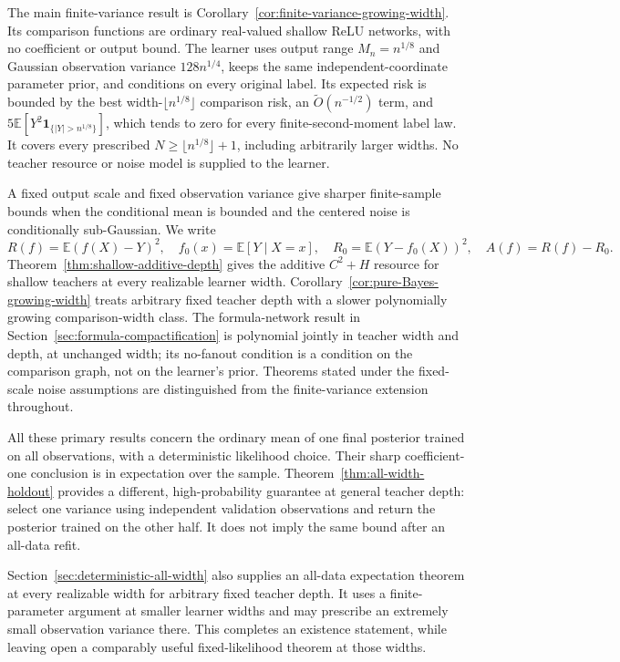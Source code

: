 \documentclass[11pt]{article}
\newcommand{\E}{\mathbb E}
\begin{document}
The main finite-variance result is Corollary~\ref{cor:finite-variance-growing-width}. Its comparison functions are ordinary real-valued shallow ReLU networks, with no coefficient or output bound. The learner uses output range $M_n=n^{1/8}$ and Gaussian observation variance $128n^{1/4}$, keeps the same independent-coordinate parameter prior, and conditions on every original label. Its expected risk is bounded by the best width-$\lfloor n^{1/8}\rfloor$ comparison risk, an $\widetilde O(n^{-1/2})$ term, and
$5\E[Y^2\mathbf1_{\{|Y|>n^{1/8}\}}]$, which tends to zero for every finite-second-moment label law. It covers every prescribed $N\ge\lfloor n^{1/8}\rfloor+1$, including arbitrarily larger widths. No teacher resource or noise model is supplied to the learner.

A fixed output scale and fixed observation variance give sharper finite-sample bounds when the conditional mean is bounded and the centered noise is conditionally sub-Gaussian. We write
\[
 R(f)=\E(f(X)-Y)^2,\quad f_0(x)=\E[Y\mid X=x],\quad
 R_0=\E(Y-f_0(X))^2,\quad A(f)=R(f)-R_0.
\]
Theorem~\ref{thm:shallow-additive-depth} gives the additive $C^2+H$ resource for shallow teachers at every realizable learner width. Corollary~\ref{cor:pure-Bayes-growing-width} treats arbitrary fixed teacher depth with a slower polynomially growing comparison-width class. The formula-network result in Section~\ref{sec:formula-compactification} is polynomial jointly in teacher width and depth, at unchanged width; its no-fanout condition is a condition on the comparison graph, not on the learner's prior. Theorems stated under the fixed-scale noise assumptions are distinguished from the finite-variance extension throughout.

All these primary results concern the ordinary mean of one final posterior trained on all observations, with a deterministic likelihood choice. Their sharp coefficient-one conclusion is in expectation over the sample. Theorem~\ref{thm:all-width-holdout} provides a different, high-probability guarantee at general teacher depth: select one variance using independent validation observations and return the posterior trained on the other half. It does not imply the same bound after an all-data refit.

Section~\ref{sec:deterministic-all-width} also supplies an all-data expectation theorem at every realizable width for arbitrary fixed teacher depth. It uses a finite-parameter argument at smaller learner widths and may prescribe an extremely small observation variance there. This completes an existence statement, while leaving open a comparably useful fixed-likelihood theorem at those widths.
\end{document}
